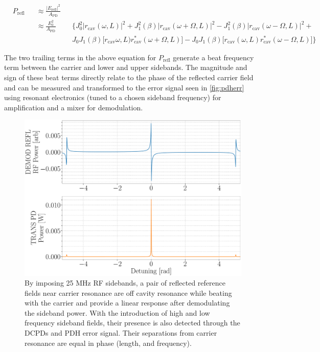 \begin{equation}
 \begin{alignedat}{3}
    &P_\mathrm{refl} && \approx \frac{|E_\mathrm{refl}|^2}{A_\mathrm{PD}} && \\
    & &&\approx \frac{E_0^2}{A_\mathrm{PD}} && \bigg\{J_0^2 |r_\mathrm{cav}(\omega,L)|^2 + J_1^2(\beta)|r_\mathrm{cav}(\omega+\Omega,L)|^2 - J_1^2(\beta)|r_\mathrm{cav}(\omega-\Omega,L)|^2 +  \\
    & && && J_0J_1(\beta)\big[r_\mathrm{cav}\omega,L) r_\mathrm{cav}^*(\omega+\Omega,L)\big] - J_ 0J_1(\beta)\big[r_\mathrm{cav}(\omega,L)r_\mathrm{cav}^*(\omega-\Omega,L)\big]\bigg\}
  \end{alignedat}
\end{equation}

The two trailing terms in the above equation for $P_\mathrm{refl}$ generate a beat frequency term between the carrier and lower and upper sidebands. The magnitude and sign of these beat terms directly relate to the phase of the reflected carrier field and can be measured and transformed to the error signal seen in \autoref{fig:pdherr} using resonant electronics (tuned to a chosen sideband frequency) for amplification and a mixer for demodulation.

\begin{figure}[H]
	\includegraphics[width=\textwidth]{figs/ALGAAS/pdh_error.pdf}
	\caption{By imposing 25 MHz RF sidebands, a pair of reflected reference fields near carrier resonance are off cavity resonance while beating with the carrier and provide a linear response after demodulating the sideband power. With the introduction of high and low frequency sideband fields, their presence is also detected through the DCPDs and PDH error signal. Their separations from carrier resonance are equal in phase (length, and frequency).}
\label{fig:pdherr}
\end{figure}

